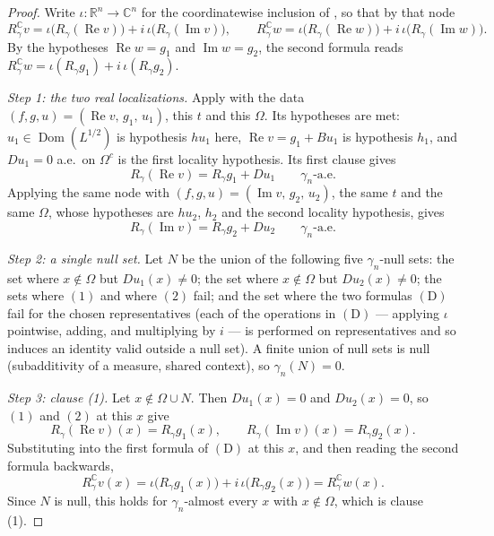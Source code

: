 \begin{proof}
Write $\iota : \mathbb{R}^n \to \mathbb{C}^n$ for the coordinatewise inclusion
of , so that by that node
\begin{equation*}
  R_\gamma^{\mathbb{C}} v
    = \iota\bigl(R_\gamma(\operatorname{Re} v)\bigr)
      + i\,\iota\bigl(R_\gamma(\operatorname{Im} v)\bigr),
  \qquad
  R_\gamma^{\mathbb{C}} w
    = \iota\bigl(R_\gamma(\operatorname{Re} w)\bigr)
      + i\,\iota\bigl(R_\gamma(\operatorname{Im} w)\bigr) . \tag{D}
\end{equation*}
By the hypotheses $\operatorname{Re} w = g_1$ and $\operatorname{Im} w = g_2$, the
second formula reads
$R_\gamma^{\mathbb{C}} w = \iota(R_\gamma g_1) + i\,\iota(R_\gamma g_2)$.

\emph{Step 1: the two real localizations.}
Apply  with the data
$(f, g, u) = (\operatorname{Re} v,\, g_1,\, u_1)$, this $t$ and this $\Omega$.
Its hypotheses are met: $u_1 \in \operatorname{Dom}(L^{1/2})$ is hypothesis
$hu_1$ here, $\operatorname{Re} v = g_1 + Bu_1$ is hypothesis $h_1$, and
$Du_1 = 0$ a.e.\ on $\Omega^c$ is the first locality hypothesis.  Its first
clause gives
\begin{equation*}
  R_\gamma(\operatorname{Re} v) = R_\gamma g_1 + Du_1
  \qquad \gamma_n\text{-a.e.} \tag{1}
\end{equation*}
Applying the same node with $(f,g,u) = (\operatorname{Im} v,\, g_2,\, u_2)$, the
same $t$ and the same $\Omega$, whose hypotheses are $hu_2$, $h_2$ and the
second locality hypothesis, gives
\begin{equation*}
  R_\gamma(\operatorname{Im} v) = R_\gamma g_2 + Du_2
  \qquad \gamma_n\text{-a.e.} \tag{2}
\end{equation*}

\emph{Step 2: a single null set.}
Let $N$ be the union of the following five $\gamma_n$-null sets: the set where
$x \notin \Omega$ but $Du_1(x) \neq 0$; the set where $x \notin \Omega$ but
$Du_2(x) \neq 0$; the sets where $(1)$ and where $(2)$ fail; and the set where
the two formulas $(\mathrm{D})$ fail for the chosen representatives (each of the
operations in $(\mathrm{D})$ --- applying $\iota$ pointwise, adding, and
multiplying by $i$ --- is performed on representatives and so induces an
identity valid outside a null set).  A finite union of null sets is null
(subadditivity of a measure, shared context), so $\gamma_n(N) = 0$.

\emph{Step 3: clause (1).}
Let $x \notin \Omega \cup N$.  Then $Du_1(x) = 0$ and $Du_2(x) = 0$, so $(1)$
and $(2)$ at this $x$ give
\[
  R_\gamma(\operatorname{Re} v)(x) = R_\gamma g_1(x),
  \qquad
  R_\gamma(\operatorname{Im} v)(x) = R_\gamma g_2(x) .
\]
Substituting into the first formula of $(\mathrm{D})$ at this $x$, and then
reading the second formula backwards,
\[
  R_\gamma^{\mathbb{C}} v(x)
    = \iota\bigl(R_\gamma g_1(x)\bigr) + i\,\iota\bigl(R_\gamma g_2(x)\bigr)
    = R_\gamma^{\mathbb{C}} w(x) .
\]
Since $N$ is null, this holds for $\gamma_n$-almost every $x$ with
$x \notin \Omega$, which is clause (1).


\end{proof}
